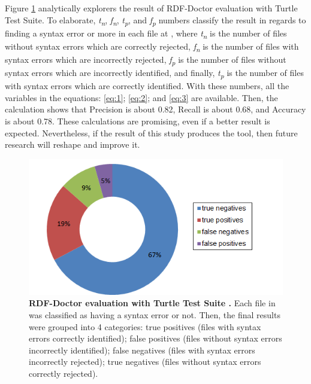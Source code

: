 Figure \ref{Fig:Experiment01} analytically explorers the result of RDF-Doctor evaluation  with Turtle Test Suite. To elaborate, \textit{t\textsubscript{n}}, 
\textit{f\textsubscript{n}}, 
\textit{t\textsubscript{p}}, 
and \textit{f\textsubscript{p}} numbers classify the result in regards to finding a syntax error  or more in each file at \cite{TurtleTests:Online}, where \textit{t\textsubscript{n}} is the number of files without syntax errors which are correctly rejected, \textit{f\textsubscript{n}} is  the number of files  with  syntax  errors  which are  incorrectly  rejected, \textit{f\textsubscript{p}} is the number of
 files without syntax errors  which are incorrectly identified, and finally, \textit{t\textsubscript{p}} is the number of files with syntax errors  which are correctly identified. With these numbers, all the variables in the equations: \ref{eq:1};  \ref{eq:2}; and \ref{eq:3} are available. Then, the calculation shows that Precision is about 0.82,  Recall is about 0.68, and Accuracy is about 0.78. These calculations are promising, even if a better result is expected. Nevertheless, if the result of this study produces the tool, then future research will reshape and improve it.    
 
 
\begin{figure}
\begin{center}
		\includegraphics[scale=.8,angle=0]{images/Experiment01.png}
		\vspace*{-1mm}
		\caption{\textbf{RDF-Doctor evaluation with Turtle Test Suite \cite{TurtleTests:Online}.} Each file in \cite{TurtleTests:Online} was classified as having a syntax error or not. Then, the final results were grouped into 4 categories: true positives (files with syntax errors  correctly identified); false positives (files without syntax errors  incorrectly identified); false negatives (files with syntax errors  incorrectly rejected); true negatives (files without syntax errors  correctly rejected).}
		\label{Fig:Experiment01}
\end{center}
\end{figure}

